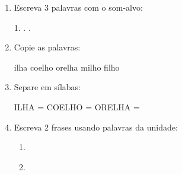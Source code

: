 \begin{exercicio}
\begin{enumerate}[resume]
  \item Escreva 3 palavras com o som-alvo:
  \begin{center}
  1. \underline{\hspace{3cm}} . \underline{\hspace{3cm}} . \underline{\hspace{3cm}}
  \end{center}

  \item Copie as palavras:
  \begin{center}
  ilha \quad coelho \quad orelha \quad milho \quad filho
  \end{center}

  \item Separe em sílabas:
  \begin{center}
  ILHA = \underline{\hspace{1cm}} \underline{\hspace{1cm}} \quad COELHO = \underline{\hspace{1cm}} \underline{\hspace{1cm}} \quad ORELHA = \underline{\hspace{1cm}} \underline{\hspace{1cm}}
  \end{center}

  \item Escreva 2 frases usando palavras da unidade:
  \begin{enumerate}[label=\alph*)]
    \item \underline{\hspace{8cm}}
    \item \underline{\hspace{8cm}}
  \end{enumerate}

\end{enumerate}

\end{exercicio}



